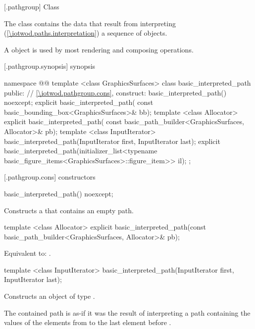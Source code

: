  [\iotwod.pathgroup] {Class }

\pnum
{}%
The class  contains the data that result from interpreting (\ref{\iotwod.paths.interpretation}) a sequence of  objects.

\pnum
A  object is used by most rendering and composing operations.

 [\iotwod.pathgroup.synopsis] { synopsis}

\begin{codeblock}
namespace @\fullnamespace{}@ {
  template <class GraphicsSurfaces>
  class basic_interpreted_path {
  public:
    // \ref{\iotwod.pathgroup.cons}, construct:
    basic_interpreted_path() noexcept;
    explicit basic_interpreted_path(
      const basic_bounding_box<GraphicsSurfaces>& bb);
    template <class Allocator>
    explicit basic_interpreted_path(
      const basic_path_builder<GraphicsSurfaces, Allocator>& pb);
    template <class InputIterator>
    basic_interpreted_path(InputIterator first, InputIterator last);
    explicit basic_interpreted_path(initializer_list<typename
      basic_figure_items<GraphicsSurfaces>::figure_item>> il);
  };
}
\end{codeblock}

 [\iotwod.pathgroup.cons] { constructors}

%
\begin{itemdecl}
basic_interpreted_path() noexcept;
\end{itemdecl}
\begin{itemdescr}
\pnum
\effects
Constructs a  that contains an empty path.
\end{itemdescr}

%
\begin{itemdecl}
template <class Allocator>
explicit basic_interpreted_path(const basic_path_builder<GraphicsSurfaces, Allocator>& pb);
\end{itemdecl}
\begin{itemdescr}
\pnum
\effects
Equivalent to: .	
\end{itemdescr}

%
\begin{itemdecl}
template <class InputIterator>
basic_interpreted_path(InputIterator first, InputIterator last);
\end{itemdecl}
\begin{itemdescr}
\pnum
\effects
Constructs an object of type .

\pnum
The contained path is as-if it was the result of interpreting a path containing the values of the elements from  to the last element before .
\end{itemdescr}

